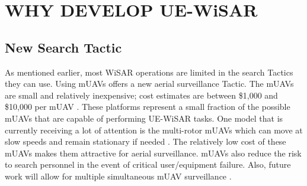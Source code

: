 \documentclass[12pt]{IEEEtran}
\begin{document}
% 

\section{WHY DEVELOP UE-WiSAR}
\subsection{New Search Tactic}
As mentioned earlier, most WiSAR operations are limited in the search Tactics
they can use.  Using mUAVs offers a new aerial surveillance Tactic.  The mUAVs
are small and relatively inexpensive; cost estimates are between \$1,000 and
\$10,000 per mUAV
\cite{goodrich2008supporting,goodrich2007using,adams2007camera}.
These platforms represent a small fraction of the possible mUAVs that are capable of performing
UE-WiSAR tasks.  One model that is currently receiving a lot of attention is the
multi-rotor mUAVs which can move at slow speeds and remain stationary if needed
\cite{almurib2011control}.  The relatively low cost of these mUAVs makes them
attractive for aerial surveillance.  mUAVs also reduce the risk to search
personnel in the event of critical user/equipment failure.  Also, future work
will allow for multiple simultaneous mUAV surveillance 
\cite{waharte2009coordinated}.  
\end{document}
